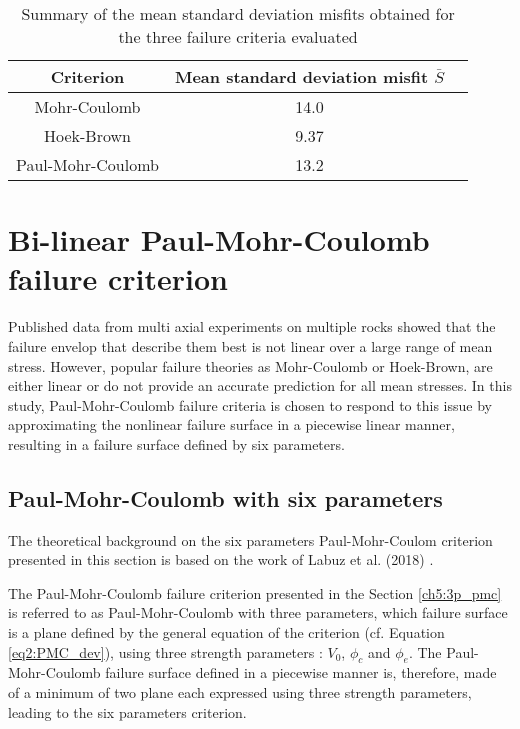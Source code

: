 \begin{table}
    \centering
    \begin{tabular}{ccc}
        \hline 
        Criterion & Mean standard deviation misfit $\bar{S}$ \\
        \hline
        \hline
        Mohr-Coulomb & 14.0 \\
        Hoek-Brown & 9.37 \\
        Paul-Mohr-Coulomb & 13.2 \\
        \hline
    \end{tabular}
    \captionsetup{justification=centering}
    \caption{Summary of the mean standard deviation misfits obtained for the three failure criteria evaluated}
    \label{tb5:stand_dev}
\end{table}

\section{Bi-linear Paul-Mohr-Coulomb failure criterion}\label{ch5:PMC}

Published data from multi axial experiments on multiple rocks showed that the failure envelop that describe them best is not linear over a large range of mean stress. However, popular failure theories as Mohr-Coulomb or Hoek-Brown, are either linear or do not provide an accurate prediction for all mean stresses. In this study, Paul-Mohr-Coulomb failure criteria is chosen to respond to this issue by approximating the nonlinear failure surface in a piecewise linear manner, resulting in a failure surface defined by six parameters.

\subsection{Paul-Mohr-Coulomb with six parameters}\label{ch5:PMC_theo_6p}

The theoretical background on the six parameters Paul-Mohr-Coulom criterion presented in this section is based on the work of Labuz et al. (2018) \cite{Labuz2018}.

The Paul-Mohr-Coulomb failure criterion presented in the Section \ref{ch5:3p_pmc} is referred to as Paul-Mohr-Coulomb with three parameters, which failure surface is a plane defined by the general equation of the criterion (cf. Equation \ref{eq2:PMC_dev}), using three strength parameters : $V_0$, $\phi_c$ and $\phi_e$. The Paul-Mohr-Coulomb failure surface defined in a piecewise manner is, therefore, made of a minimum of two plane each expressed using three strength parameters, leading to the six parameters criterion.

